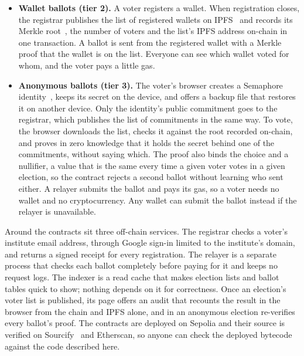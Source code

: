 \begin{itemize}[leftmargin=1.2em,itemsep=2pt,topsep=2pt]
  \item \textbf{Wallet ballots (tier 2).} A voter registers a wallet. When
        registration closes, the registrar publishes the list of registered
        wallets on IPFS~\cite{ipfs} and records its Merkle root~\cite{merkle},
        the number of voters and the list's IPFS address on-chain in one
        transaction. A ballot is sent from the registered wallet with a Merkle
        proof that the wallet is on the list. Everyone can see which wallet
        voted for whom, and the voter pays a little gas.
  \item \textbf{Anonymous ballots (tier 3).} The voter's browser creates a
        Semaphore identity~\cite{semaphore}, keeps its secret on the device, and
        offers a backup file that restores it on another device. Only the
        identity's public commitment goes to the registrar, which publishes the
        list of commitments in the same way. To vote, the browser downloads the
        list, checks it against the root recorded on-chain, and proves in zero
        knowledge that it holds the secret behind one of the commitments,
        without saying which. The proof also binds the choice and a nullifier,
        a value that is the same every time a given voter votes in a given
        election, so the contract rejects a second ballot without learning who
        sent either. A relayer submits the ballot and pays its gas, so a voter
        needs no wallet and no cryptocurrency. Any wallet can submit the ballot
        instead if the relayer is unavailable.
\end{itemize}

Around the contracts sit three off-chain services. The registrar checks a
voter's institute email address, through Google sign-in limited to the
institute's domain, and returns a signed receipt for every registration. The relayer is a separate process that checks
each ballot completely before paying for it and keeps no request logs. The
indexer is a read cache that makes election lists and ballot tables quick to
show; nothing depends on it for correctness. Once an election's voter list is
published, its page offers an audit that recounts the result in the browser
from the chain and IPFS alone, and in an anonymous election re-verifies every
ballot's proof. The contracts are
deployed on Sepolia and their source is verified on Sourcify~\cite{sourcify} and
Etherscan, so
anyone can check the deployed bytecode against the code described here.

